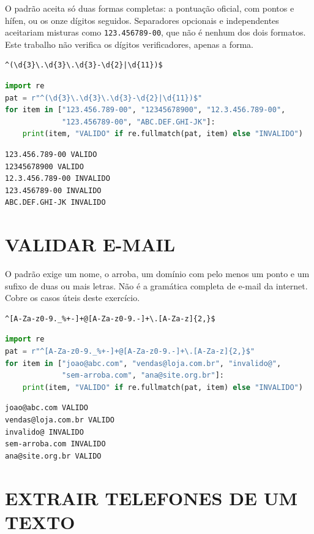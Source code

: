 \documentclass[
    12pt,
    oneside,
    a4paper,
    chapter=TITLE,
    section=TITLE,
    sumario=abnt-6027-2012
]{abntex2}
\begin{document}
O padrão aceita só duas formas completas: a pontuação oficial, com pontos e hífen, ou os onze dígitos seguidos. Separadores opcionais e independentes aceitariam misturas como \texttt{123.456789-00}, que não é nenhum dos dois formatos. Este trabalho não verifica os dígitos verificadores, apenas a forma.

\begin{lstlisting}
^(\d{3}\.\d{3}\.\d{3}-\d{2}|\d{11})$
\end{lstlisting}

\begin{lstlisting}[language=Python]
import re
pat = r"^(\d{3}\.\d{3}\.\d{3}-\d{2}|\d{11})$"
for item in ["123.456.789-00", "12345678900", "12.3.456.789-00",
             "123.456789-00", "ABC.DEF.GHI-JK"]:
    print(item, "VALIDO" if re.fullmatch(pat, item) else "INVALIDO")
\end{lstlisting}

\begin{lstlisting}
123.456.789-00 VALIDO
12345678900 VALIDO
12.3.456.789-00 INVALIDO
123.456789-00 INVALIDO
ABC.DEF.GHI-JK INVALIDO
\end{lstlisting}

\section{VALIDAR E-MAIL}

O padrão exige um nome, o arroba, um domínio com pelo menos um ponto e um sufixo de duas ou mais letras. Não é a gramática completa de e-mail da internet. Cobre os casos úteis deste exercício.

\begin{lstlisting}
^[A-Za-z0-9._%+-]+@[A-Za-z0-9.-]+\.[A-Za-z]{2,}$
\end{lstlisting}

\begin{lstlisting}[language=Python]
import re
pat = r"^[A-Za-z0-9._%+-]+@[A-Za-z0-9.-]+\.[A-Za-z]{2,}$"
for item in ["joao@abc.com", "vendas@loja.com.br", "invalido@",
             "sem-arroba.com", "ana@site.org.br"]:
    print(item, "VALIDO" if re.fullmatch(pat, item) else "INVALIDO")
\end{lstlisting}

\begin{lstlisting}
joao@abc.com VALIDO
vendas@loja.com.br VALIDO
invalido@ INVALIDO
sem-arroba.com INVALIDO
ana@site.org.br VALIDO
\end{lstlisting}

\section{EXTRAIR TELEFONES DE UM TEXTO}
\end{document}
